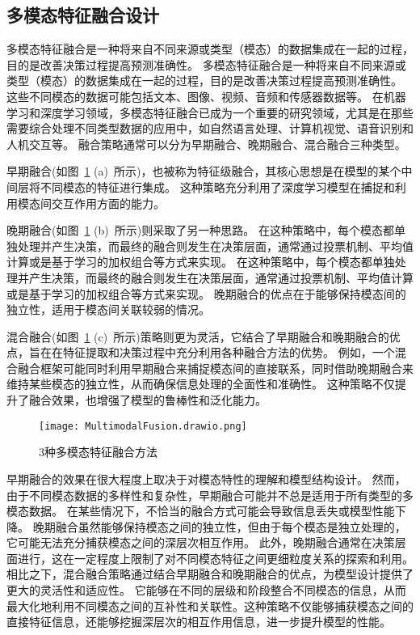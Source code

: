 \subsection{多模态特征融合设计}
多模态特征融合是一种将来自不同来源或类型（模态）的数据集成在一起的过程，目的是改善决策过程提高预测准确性。
多模态特征融合是一种将来自不同来源或类型（模态）的数据集成在一起的过程，目的是改善决策过程提高预测准确性。
这些不同模态的数据可能包括文本、图像、视频、音频和传感器数据等。
在机器学习和深度学习领域，多模态特征融合已成为一个重要的研究领域，尤其是在那些需要综合处理不同类型数据的应用中，如自然语言处理、计算机视觉、语音识别和人机交互等。
融合策略通常可以分为早期融合、晚期融合、混合融合三种类型\cite{hejunandzhangcaiqing}。\par

早期融合(如图~\ref{fig:MultimodalFusio} (a)~所示)，也被称为特征级融合，其核心思想是在模型的某个中间层将不同模态的特征进行集成。
这种策略充分利用了深度学习模型在捕捉和利用模态间交互作用方面的能力。\par

晚期融合(如图~\ref{fig:MultimodalFusio} (b)~所示)则采取了另一种思路。
在这种策略中，每个模态都单独处理并产生决策，而最终的融合则发生在决策层面，通常通过投票机制、平均值计算或是基于学习的加权组合等方式来实现。
在这种策略中，每个模态都单独处理并产生决策，而最终的融合则发生在决策层面，通常通过投票机制、平均值计算或是基于学习的加权组合等方式来实现。
晚期融合的优点在于能够保持模态间的独立性，适用于模态间关联较弱的情况。\par

混合融合(如图~\ref{fig:MultimodalFusio} (c)~所示)策略则更为灵活，它结合了早期融合和晚期融合的优点，旨在在特征提取和决策过程中充分利用各种融合方法的优势。
例如，一个混合融合框架可能同时利用早期融合来捕捉模态间的直接联系，同时借助晚期融合来维持某些模态的独立性，从而确保信息处理的全面性和准确性。
这种策略不仅提升了融合效果，也增强了模型的鲁棒性和泛化能力。\par

\begin{figure}[h]
	\centering
	\texttt{[image: MultimodalFusion.drawio.png]}
	\caption{3种多模态特征融合方法}
	\label{fig:MultimodalFusio}
\end{figure}


早期融合的效果在很大程度上取决于对模态特性的理解和模型结构设计。
然而，由于不同模态数据的多样性和复杂性，早期融合可能并不总是适用于所有类型的多模态数据。
在某些情况下，不恰当的融合方式可能会导致信息丢失或模型性能下降。
晚期融合虽然能够保持模态之间的独立性，但由于每个模态是独立处理的，它可能无法充分捕获模态之间的深层次相互作用。
此外，晚期融合通常在决策层面进行，这在一定程度上限制了对不同模态特征之间更细粒度关系的探索和利用。
相比之下，混合融合策略通过结合早期融合和晚期融合的优点，为模型设计提供了更大的灵活性和适应性。
它能够在不同的层级和阶段整合不同模态的信息，从而最大化地利用不同模态之间的互补性和关联性。这种策略不仅能够捕获模态之间的直接特征信息，还能够挖掘深层次的相互作用信息，进一步提升模型的性能。\par



